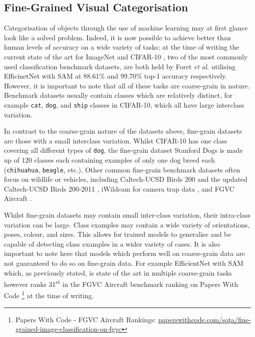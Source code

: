 \subsection{Fine-Grained Visual Categorisation}\label{ch:Background,sec:Fine-grainedCV}

Categorisation of objects through the use of machine learning may at first glance look like a solved problem. Indeed, it is now possible to achieve better than human levels of accuracy on a wide variety of tasks; at the time of writing the current state of the art for ImageNet \cite{deng_imagenet:_2009} and CIFAR-10 \cite{krizhevsky_learning_2009}, two of the most commonly used classification benchmark datasets, are both held by Foret \textit{et al.} utilising EfficinetNet with SAM \cite{foret_sharpness-aware_2020} at 88.61\% and 99.70\% top-1 accuracy respectively. However, it is important to note that all of these tasks are coarse-grain in nature. Benchmark datasets usually contain classes which are relatively distinct, for example \texttt{cat}, \texttt{dog}, and \texttt{ship} classes in CIFAR-10, which all have large interclass variation. 

In contrast to the coarse-grain nature of the datasets above, fine-grain datasets are those with a small interclass variation. Whilst CIFAR-10 has one class covering all different types of \texttt{dog}, the fine-grain dataset Stanford Dogs \cite{khosla_novel_2011} is made up of 120 classes each containing examples of only one dog breed each (\texttt{chihuahua}, \texttt{beagle}, etc.). Other common fine-grain benchmark datasets often focus on wildlife or vehicles, including Caltech-UCSD Birds 200 \cite{welinder_caltech-ucsd_2010} and the updated Caltech-UCSD Birds 200-2011 \cite{wah_caltech-ucsd_2011}, iWildcam for camera trap data \cite{beery_iwildcam_2019}, and FGVC Aircraft \cite{maji_fine-grained_2013}. 

Whilst fine-grain datasets may contain small inter-class variation, their intra-class variation can be large. Class examples may contain a wide variety of orientations, poses, colour, and sizes. This allows for trained models to generalise and be capable of detecting class examples in a wider variety of cases. It is also important to note here that models which perform well on coarse-grain data are not guaranteed to do so on fine-grain data. For example EfficientNet with SAM which, as previously stated, is state of the art in multiple coarse-grain tasks however ranks 31\textsuperscript{st} in the FGVC Aircraft benchmark ranking on Papers With Code \footnote{Papers With Code - FGVC Aircraft Rankings: \href{https://paperswithcode.com/sota/fine-grained-image-classification-on-fgvc}{paperswithcode.com/sota/fine-grained-image-classification-on-fgvc}} at the time of writing.


